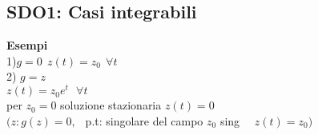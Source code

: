\documentclass[12px]{article}
\begin{document}
\subsection{SDO1: Casi integrabili}
\textbf{Esempi}\\
1)$g = 0 \ \ z(t) = z_0 \ \ \forall t$\\
2) $g = z$\\
$z(t) = z_0 e^t \ \ \ \forall t$\\
per $z_0 = 0$ soluzione stazionaria $z(t) = 0$\\
 $(z: g(z) = 0, \ \ $ p.t: singolare del campo $z_0$ sing \ \ $z(t) = z_0) $
\end{document}
